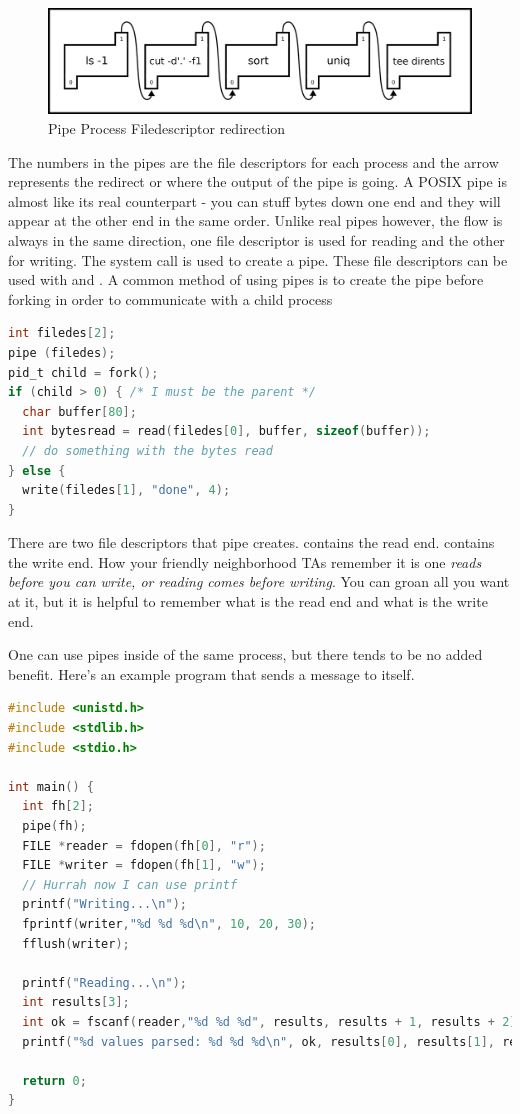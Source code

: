 \begin{figure}[H]
  \centering
  \includegraphics[width=.8\textwidth]{ipc/drawings/pipe_process.eps}
  \caption{Pipe Process Filedescriptor redirection}
\end{figure}

The numbers in the pipes are the file descriptors for each process and the arrow represents the redirect or where the output of the pipe is going.
A POSIX pipe is almost like its real counterpart - you can stuff bytes down one end and they will appear at the other end in the same order.
Unlike real pipes however, the flow is always in the same direction, one file descriptor is used for reading and the other for writing.
The  system call is used to create a pipe.
These file descriptors can be used with  and .
A common method of using pipes is to create the pipe before forking in order to communicate with a child process

\begin{lstlisting}[language=C]
int filedes[2];
pipe (filedes);
pid_t child = fork();
if (child > 0) { /* I must be the parent */
  char buffer[80];
  int bytesread = read(filedes[0], buffer, sizeof(buffer));
  // do something with the bytes read
} else {
  write(filedes[1], "done", 4);
}
\end{lstlisting}

There are two file descriptors that pipe creates.
 contains the read end.
 contains the write end.
How your friendly neighborhood TAs remember it is one \textit{reads before you can write, or reading comes before writing}.
You can groan all you want at it, but it is helpful to remember what is the read end and what is the write end.

One can use pipes inside of the same process, but there tends to be no added benefit.
Here's an example program that sends a message to itself.

\begin{lstlisting}[language=C]
#include <unistd.h>
#include <stdlib.h>
#include <stdio.h>

int main() {
  int fh[2];
  pipe(fh);
  FILE *reader = fdopen(fh[0], "r");
  FILE *writer = fdopen(fh[1], "w");
  // Hurrah now I can use printf
  printf("Writing...\n");
  fprintf(writer,"%d %d %d\n", 10, 20, 30);
  fflush(writer);

  printf("Reading...\n");
  int results[3];
  int ok = fscanf(reader,"%d %d %d", results, results + 1, results + 2);
  printf("%d values parsed: %d %d %d\n", ok, results[0], results[1], results[2]);

  return 0;
}
\end{lstlisting}

